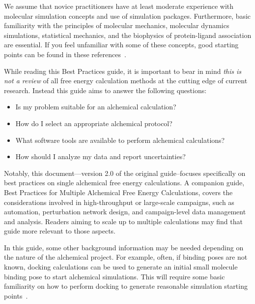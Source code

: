 \documentclass[9pt,bestpractices]{livecoms}
\begin{document}
 We assume that novice practitioners have at least moderate experience with molecular simulation concepts and use of simulation packages. 
 Furthermore, basic familiarity with the principles of molecular mechanics, molecular dynamics simulations, statistical mechanics, and the biophysics of protein-ligand association are essential. If you feel unfamiliar with some of these concepts, good starting points can be found in these references~\cite{braun2019best, grossfield2018best, klimovich2015guidelines, shirts2012best}. 

 While reading this Best Practices guide, it is important to bear in mind \emph{this is not a review} of all free energy calculation methods at the cutting edge of current research.
Instead this guide aims to answer the following questions:
\begin{itemize}
    \item Is my problem suitable for an alchemical calculation? 
     \item How do I select an appropriate alchemical protocol? 
     \item What software tools are available to perform alchemical calculations? 
     \item How should I analyze my data and report uncertainties? 
\end{itemize}

Notably, this document---version 2.0 of the original guide--focuses specifically on best practices on single alchemical free energy calculations. A companion guide, Best Practices for Multiple Alchemical Free Energy Calculations, covers the considerations involved in high-throughput or large-scale campaigns, such as automation, perturbation network design, and campaign-level data management and analysis. Readers aiming to scale up to multiple calculations may find that guide more relevant to those aspects. 

In this guide, some other background information may be needed depending on the nature of the alchemical project. For example, often, if binding poses are not known, docking calculations can be used to generate an initial small molecule binding pose to start alchemical simulations. This will require some basic familiarity on how to perform docking to generate reasonable simulation starting points~\cite{grinter2014challenges}. 
\end{document}
